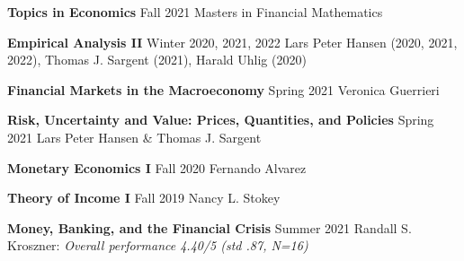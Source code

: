 
\begin{cventries}
  \cventry
    {\textbf{Topics in Economics}} %
    {} %
    {} %
    {Fall 2021} %
    {Masters in Financial Mathematics}

\end{cventries}


\begin{cventries}

  \cventry
    {\textbf{Empirical Analysis II}} %
    {} %
    {} %
    {Winter 2020, 2021, 2022} %
    {Lars Peter Hansen (2020, 2021, 2022), Thomas J. Sargent (2021), Harald Uhlig (2020)}
    
  \cventry
    {\textbf{Financial Markets in the Macroeconomy}} %
    {} %
    {} %
    {Spring 2021} %
    {Veronica Guerrieri}

  \cventry
    {\textbf{Risk, Uncertainty and Value: Prices, Quantities, and Policies}} %
    {} %
    {} %
    {Spring 2021} %
    {Lars Peter Hansen  \& Thomas J. Sargent}
  
  \cventry
    {\textbf{Monetary Economics I}} %
    {} %
    {} %
    {Fall 2020} %
    {Fernando Alvarez}
  
    \cventry
    {\textbf{Theory of Income I}} %
    {} %
    {} %
    {Fall 2019} %
    {Nancy L. Stokey}


\end{cventries}

\begin{cventries}
  \cventry
    {\textbf{Money, Banking, and the Financial Crisis}} %
    {} %
    {} %
    {Summer 2021} %
    {Randall S. Kroszner: \emph{Overall performance  4.40/5 (std .87, N=16)}}

\end{cventries}
